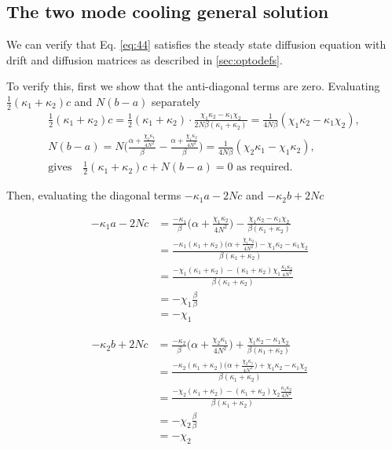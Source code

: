 \documentclass[11pt,a4paper]{article}
\numberwithin{equation}{section}
\begin{document}
	\begin{appendices}
	
	\section{The two mode cooling general solution}
	\label{sec:verifyappen}
	
	We can verify that Eq. \ref{eq:44} satisfies the steady state diffusion equation with drift and diffusion matrices as described in \ref{sec:optodefs}.
	
	To verify this, first we show that the anti-diagonal terms are zero. Evaluating $\frac{1}{2}(\kappa_1 + \kappa_2)c$ and $N(b-a)$ separately
	\begin{align*}
	&\frac{1}{2}(\kappa_1 + \kappa_2) c = \frac{1}{2}(\kappa_1 + \kappa_2) \cdot \frac{\chi_1 \kappa_2 - \kappa_1 \chi_2}{2N\beta (\kappa_1+\kappa_2)} = \frac{1}{4N\beta}(\chi_1 \kappa_2 - \kappa_1 \chi_2),&\\
	&N(b-a)= N \Big(\frac{\alpha + \frac{\chi_2 \kappa_1}{4N^2}}{\beta} -\frac{\alpha + \frac{\chi_1 \kappa_2}{4N^2}}{\beta}\Big) = \frac{1}{4N\beta}(\chi_2 \kappa_1 - \chi_1 \kappa_2),&\\
	&\text{gives}\quad\frac{1}{2}(\kappa_1 + \kappa_2)c + N(b-a) = 0\text{ as required.}&
	\end{align*}
	
	Then, evaluating the diagonal terms $-\kappa_1 a - 2Nc$ and $-\kappa_2 b + 2Nc$
	
	\begin{align*}
	-\kappa_1 a - 2Nc &= \frac{-\kappa_1}{\beta} \Big(\alpha + \frac{\chi_1 \kappa_2}{4N^2} \Big) - \frac{\chi_1 \kappa_2 - \kappa_1 \chi_2}{\beta (\kappa_1+\kappa_2)}&\\
	&= \frac{-\kappa_1 (\kappa_1+\kappa_2) \Big(\alpha + \frac{\chi_1 \kappa_2}{4N^2} \Big) - \chi_1 \kappa_2 - \kappa_1 \chi_2}{\beta (\kappa_1+\kappa_2)}&\\
	&= \frac{-\chi_1(\kappa_1+\kappa_2)- (\kappa_1+\kappa_2)\chi_1 \frac{\kappa_1 \kappa_2}{4N^2}}{\beta (\kappa_1+\kappa_2)}&\\
	&= -\chi_1 \frac{\beta}{\beta}&\\
	&= -\chi_1&
	\end{align*}
	
	\begin{align*}
	-\kappa_2 b + 2Nc &= \frac{-\kappa_2}{\beta} \Big(\alpha + \frac{\chi_2 \kappa_1}{4N^2} \Big) + \frac{\chi_1 \kappa_2 - \kappa_1 \chi_2}{\beta (\kappa_1+\kappa_2)}&\\
	&= \frac{-\kappa_2 (\kappa_1+\kappa_2) \Big(\alpha + \frac{\chi_2 \kappa_1}{4N^2} \Big) + \chi_1 \kappa_2 - \kappa_1 \chi_2}{\beta (\kappa_1+\kappa_2)}&\\
	&= \frac{-\chi_2(\kappa_1+\kappa_2)- (\kappa_1+\kappa_2)\chi_2 \frac{\kappa_1 \kappa_2}{4N^2}}{\beta (\kappa_1+\kappa_2)}&\\
	&= -\chi_2 \frac{\beta}{\beta}&\\
	&= - \chi_2&
	\end{align*}
	

\end{appendices}
\end{document}
